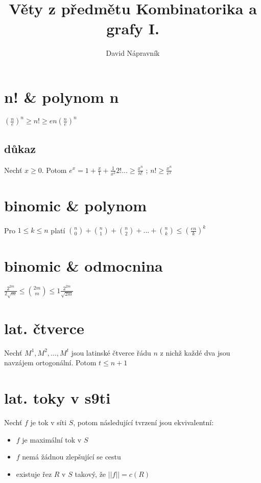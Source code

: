 \documentclass[10pt,a4paper]{article}
\begin{document}
\title{Věty z předmětu Kombinatorika a grafy I.}
\author{David Nápravník}
\maketitle


\tableofcontents
\section{n! \& polynom n}
$
(\frac{n}{e})^n \geq n! \geq en(\frac{n}{e})^n
$
\subsection*{důkaz}
Nechť $x \geq 0$. Potom $e^x = 1 + \frac{x}{1}+\frac1{x^2}{2!} ... \geq \frac{x^n}{n!}$ ; $n! \geq \frac{x^n}{e^x}$

\section{binomic \& polynom}
Pro $ 1 \leq k \leq n $ platí
$
\binom{n}{0}+\binom{n}{1}+\binom{n}{2}+...+\binom{n}{k} \leq (\frac{en}{k})^k
$

\section{binomic \& odmocnina}
$
\frac{2^{2m}}{2\sqrt{m}} \leq
\binom{2m}{m} \leq1
\frac{2^{2m}}{\sqrt{2m}}
$


\section{lat. čtverce}
Nechť $M^1, M^2, ..., M^t$ jsou latinské čtverce řádu $n$ z nichž 
každé dva jsou navzájem ortogonální. Potom $t \leq n+1$


\section{lat. toky v s9ti}
Nechť $f$ je tok v síti $S$, potom následující tvrzení jsou ekvivalentní:
\begin{itemize}
\item $f$ je maximální tok v $S$
\item $f$ nemá žádnou zlepšující se cestu
\item existuje řez $R$ v $S$ takový, že $||f|| = c(R)$ 
\end{itemize}
\end{document}
